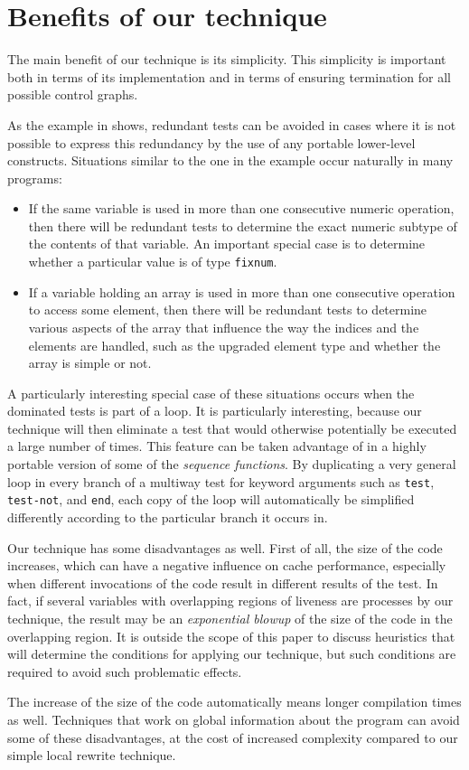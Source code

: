 \section{Benefits of our technique}

The main benefit of our technique is its simplicity.  This simplicity
is important both in terms of its implementation and in terms of
ensuring termination for all possible control graphs.

As the example in  shows, redundant
tests can be avoided in cases where it is not possible to express this
redundancy by the use of any portable lower-level constructs.
Situations similar to the one in the example occur naturally in many
programs:

\begin{itemize}
\item If the same variable is used in more than one consecutive
  numeric operation, then there will be redundant tests to determine
  the exact numeric subtype of the contents of that variable.  An
  important special case is to determine whether a particular value is
  of type \texttt{fixnum}.
\item If a variable holding an array is used in more than one
  consecutive operation to access some element, then there will be
  redundant tests to determine various aspects of the array that
  influence the way the indices and the elements are handled, such as
  the upgraded element type and whether the array is simple or not.
\end{itemize}

A particularly interesting special case of these situations occurs
when the dominated tests is part of a loop.  It is particularly
interesting, because our technique will then eliminate a test that
would otherwise potentially be executed a large number of times.  This
feature can be taken advantage of in a highly portable version of some
of the \commonlisp{} \emph{sequence functions}.  By duplicating a very
general loop in every branch of a multiway test for keyword arguments
such as \texttt{test}, \texttt{test-not}, and \texttt{end}, each copy
of the loop will automatically be simplified differently according to
the particular branch it occurs in.

Our technique has some disadvantages as well.  First of all, the size
of the code increases, which can have a negative influence on cache
performance, especially when different invocations of the code result
in different results of the test.  In fact, if several variables with
overlapping regions of liveness are processes by our technique, the
result may be an \emph{exponential blowup} of the size of the code in
the overlapping region.  It is outside the scope of this paper to
discuss heuristics that will determine the conditions for applying our
technique, but such conditions are required to avoid such problematic
effects.

The increase of the size of the code automatically means longer
compilation times as well.  Techniques that work on global information
about the program can avoid some of these disadvantages, at the cost
of increased complexity compared to our simple local rewrite
technique.
